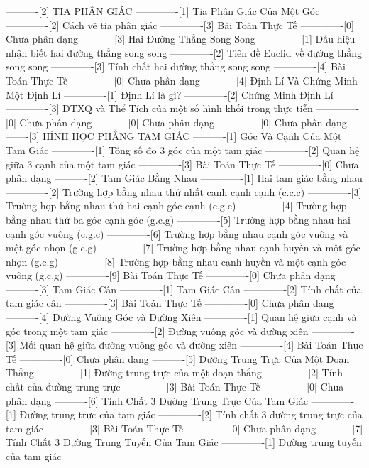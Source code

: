 ----------[2] TIA PHÂN GIÁC
-------------[1] Tia Phân Giác Của Một Góc
-------------[2] Cách vẽ tia phân giác
-------------[3] Bài Toán Thực Tế
-------------[0] Chưa phân dạng
----------[3] Hai Đường Thẳng Song Song
-------------[1] Dấu hiệu nhận biết hai đường thẳng song song
-------------[2] Tiên đề Euclid về đường thẳng song song
-------------[3] Tính chất hai đường thẳng song song 
-------------[4] Bài Toán Thực Tế
-------------[0] Chưa phân dạng
----------[4] Định Lí Và Chứng Minh Một Định Lí
-------------[1] Định Lí là gì?
-------------[2] Chứng Minh Định Lí
-------------[3] DTXQ và Thể Tích của một số hình khối trong thực tiễn
-------------[0] Chưa phân dạng
----------[0] Chưa phân dạng
-------------[0] Chưa phân dạng
-------[3] HÌNH HỌC PHẲNG TAM GIÁC
----------[1] Góc Và Cạnh Của Một Tam Giác
-------------[1] Tổng số đo 3 góc của một tam giác
-------------[2] Quan hệ giữa 3 cạnh của một tam giác
-------------[3] Bài Toán Thực Tế
-------------[0] Chưa phân dạng
----------[2] Tam Giác Bằng Nhau
-------------[1] Hai tam giác bằng nhau
-------------[2] Trường hợp bằng nhau thứ nhất cạnh cạnh cạnh (c.c.c)
-------------[3] Trường hợp bằng nhau thứ hai cạnh góc cạnh (c.g.c)
-------------[4] Trường hợp bằng nhau thứ ba góc cạnh góc (g.c.g)
-------------[5] Trường hợp bằng nhau hai cạnh góc vuông (c.g.c)
-------------[6] Trường hợp bằng nhau cạnh góc vuông và một góc nhọn (g.c.g)
-------------[7] Trường hợp bằng nhau cạnh huyền và một góc nhọn (g.c.g)
-------------[8] Trường hợp bằng nhau cạnh huyền và một cạnh góc vuông (g.c.g)
-------------[9] Bài Toán Thực Tế
-------------[0] Chưa phân dạng
----------[3] Tam Giác Cân
-------------[1] Tam Giác Cân
-------------[2] Tính chất của tam giác cân
-------------[3] Bài Toán Thực Tế
-------------[0] Chưa phân dạng
----------[4] Đường Vuông Góc và Đường Xiên
-------------[1] Quan hệ giữa cạnh và góc trong một tam giác
-------------[2] Đường vuông góc và đường xiên
-------------[3] Mối quan hệ giữa đường vuông góc và đường xiên
-------------[4] Bài Toán Thực Tế
-------------[0] Chưa phân dạng
----------[5] Đường Trung Trực Của Một Đoạn Thẳng
-------------[1] Đường trung trực của một đoạn thẳng
-------------[2] Tính chất của đường trung trực
-------------[3] Bài Toán Thực Tế
-------------[0] Chưa phân dạng
----------[6] Tính Chất 3 Đường Trung Trực Của Tam Giác
-------------[1] Đường trung trực của tam giác
-------------[2] Tính chất 3 đường trung trực của tam giác
-------------[3] Bài Toán Thực Tế
-------------[0] Chưa phân dạng
----------[7] Tính Chất 3 Đường Trung Tuyến Của Tam Giác
-------------[1] Đường trung tuyến của tam giác
